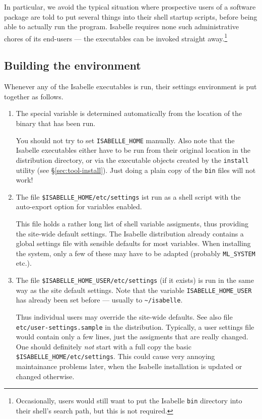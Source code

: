 In particular, we avoid the typical situation where prospective users of a
software package are told to put several things into their shell startup
scripts, before being able to actually run the program. Isabelle requires none
such administrative chores of its end-users --- the executables can be invoked
straight away.\footnote{Occasionally, users would still want to put the
  Isabelle \texttt{bin} directory into their shell's search path, but this is
  not required.}


\subsection{Building the environment}

Whenever any of the Isabelle executables is run, their settings environment is
put together as follows.

\begin{enumerate}
\item The special variable  is determined automatically
  from the location of the binary that has been run.
  
  You should not try to set \texttt{ISABELLE_HOME} manually. Also note that
  the Isabelle executables either have to be run from their original location
  in the distribution directory, or via the executable objects created by the
  \texttt{install} utility (see \S\ref{sec:tool-install}).  Just doing a plain
  copy of the \texttt{bin} files will not work!
  
\item The file \texttt{\$ISABELLE_HOME/etc/settings} ist run as a shell script
  with the auto-export option for variables enabled.
  
  This file holds a rather long list of shell variable assigments, thus
  providing the site-wide default settings.  The Isabelle distribution already
  contains a global settings file with sensible defaults for most variables.
  When installing the system, only a few of these may have to be adapted
  (probably \texttt{ML_SYSTEM} etc.).
  
\item The file \texttt{\$ISABELLE_HOME_USER/etc/settings} (if it exists) is
  run in the same way as the site default settings. Note that the variable
  \texttt{ISABELLE_HOME_USER} has already been set before --- usually to
  \texttt{\~\relax/isabelle}.
  
  Thus individual users may override the site-wide defaults. See also file
  \texttt{etc/user-settings.sample} in the distribution.  Typically, a user
  settings file would contain only a few lines, just the assigments that are
  really changed.  One should definitely \emph{not} start with a full copy the
  basic \texttt{\$ISABELLE_HOME/etc/settings}. This could cause very annoying
  maintainance problems later, when the Isabelle installation is updated or
  changed otherwise.

\end{enumerate}

